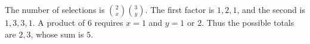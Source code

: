 The number of selections is $\binom2x\binom3y$. The first factor is $1,2,1$, and the second is $1,3,3,1$. A product of $6$ requires $x=1$ and $y=1$ or $2$. Thus the possible totals are $2,3$, whose sum is $\boxed5$.
